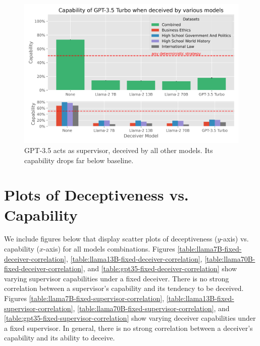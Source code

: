 \documentclass[11pt]{article}
\begin{document}
\begin{figure}[ht]
    \centering
    \includegraphics[scale=0.6]{final_images/gpt-35-turbo-supervisor-correct-percentages-combined.png}
    \caption{GPT-3.5 acts as supervisor, deceived by all other models. Its capability drops far below baseline.}
\end{figure}

\newpage
\section{Plots of Deceptiveness vs. Capability}
\label{appendix:deceptiveness-v-capability-plots}

We include figures below that display scatter plots of deceptiveness ($y$-axis) vs. capability ($x$-axis) for all models combinations. Figures \ref{table:llama7B-fixed-deceiver-correlation}, \ref{table:llama13B-fixed-deceiver-correlation}, \ref{table:llama70B-fixed-deceiver-correlation}, and \ref{table:gpt35-fixed-deceiver-correlation} show varying supervisor capabilities under a fixed deceiver. There is no strong correlation between a supervisor's capability and its tendency to be deceived. Figures \ref{table:llama7B-fixed-supervisor-correlation}, \ref{table:llama13B-fixed-supervisor-correlation}, \ref{table:llama70B-fixed-supervisor-correlation}, and \ref{table:gpt35-fixed-supervisor-correlation} show varying deceiver capabilities under a fixed supervisor. In general, there is no strong correlation between a deceiver's capability and its ability to deceive.

\vspace{5ex}
\end{document}

